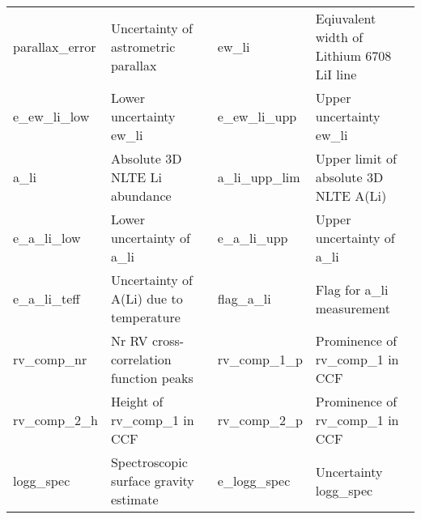 \begin{table*}[ht]
\begin{tabular}{llll}
parallax\_error & Uncertainty of astrometric parallax & ew\_li & Eqiuvalent width of Lithium 6708 LiI line \\ 
e\_ew\_li\_low & Lower uncertainty ew\_li & e\_ew\_li\_upp & Upper uncertainty ew\_li \\ 
a\_li & Absolute 3D NLTE Li abundance & a\_li\_upp\_lim & Upper limit of absolute 3D NLTE A(Li) \\ 
e\_a\_li\_low & Lower uncertainty of a\_li & e\_a\_li\_upp & Upper uncertainty of a\_li \\ 
e\_a\_li\_teff & Uncertainty of A(Li) due to temperature & flag\_a\_li & Flag for a\_li measurement \\ 
\hline
rv\_comp\_nr & Nr RV cross-correlation function peaks & rv\_comp\_1\_p & Prominence of rv\_comp\_1 in CCF \\ 
rv\_comp\_2\_h & Height of rv\_comp\_1 in CCF & rv\_comp\_2\_p & Prominence of rv\_comp\_1 in CCF \\ 
logg\_spec & Spectroscopic surface gravity estimate & e\_logg\_spec & Uncertainty logg\_spec \\ 
\hline
\end{tabular}
\end{table*}